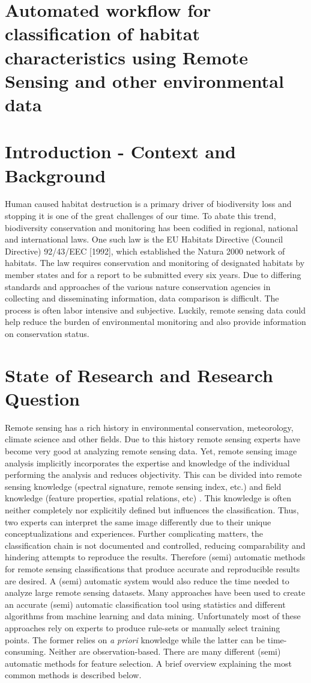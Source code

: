 \documentclass[a4paper,12pt]{article}
\begin{document}
\section{Automated workflow for classification of habitat characteristics using
Remote Sensing and other environmental data}

\section{Introduction - Context and Background}
Human caused habitat destruction is a primary driver of biodiversity loss and
stopping it is one of the great challenges of our time. To abate this trend,
biodiversity conservation and monitoring has been codified in regional, national
and international laws. One such law is the EU Habitats Directive (Council
Directive) 92/43/EEC [1992], which established the Natura 2000 network of
habitats. The law requires conservation and monitoring of designated habitats by
member states and for a report to be submitted every six years. Due to differing
standards and approaches of the various nature conservation agencies in
collecting and disseminating information, data comparison is difficult. The
process is often labor intensive and subjective. Luckily, remote sensing data
could help reduce the burden of environmental monitoring and also provide
information on conservation status.
\section{State of Research and Research Question}
Remote sensing has a rich history in environmental conservation, meteorology,
climate science and other fields. Due to this history remote sensing experts
have become very good at analyzing remote sensing data. Yet, remote sensing
image analysis implicitly incorporates the expertise and knowledge of the
individual performing the analysis and reduces objectivity. This can be divided
into remote sensing knowledge (spectral signature, remote sensing index, etc.)
and field knowledge (feature properties, spatial relations, etc)
\cite{Andres2013a}. This knowledge is often neither completely nor explicitily
defined but influences the classification. Thus, two experts can interpret the
same image differently due to their unique conceptualizations and experiences.
Further complicating matters, the classification chain is not documented and
controlled, reducing comparability and hindering attempts to reproduce the
results\cite{Arvor2013}. Therefore (semi) automatic methods for remote sensing
classifications that produce accurate and reproducible results are desired.
A (semi) automatic system would also reduce the time needed to analyze large
remote sensing datasets. Many approaches have been used to create an accurate
(semi) automatic classification tool using statistics and different algorithms
from machine learning and data mining. Unfortunately most of these approaches
rely on experts to produce rule-sets or manually select training points. The
former relies on \emph{a priori} knowledge while the latter can be
time-consuming.
Neither are observation-based. There are many different (semi) automatic methods
for feature selection. A brief overview explaining the most common methods is
described below.
\end{document}
